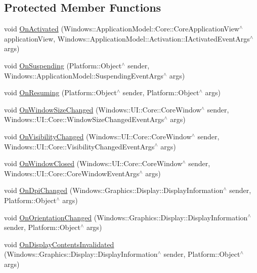 \subsection*{Protected Member Functions}
\begin{DoxyCompactItemize}
\item 
void \hyperlink{class_cube_1_1sealed_a7bfa5f48c7415394b76a4152b5fb6abf}{On\+Activated} (Windows\+::\+Application\+Model\+::\+Core\+::\+Core\+Application\+View$^\wedge$ application\+View, Windows\+::\+Application\+Model\+::\+Activation\+::\+I\+Activated\+Event\+Args$^\wedge$ args)
\item 
void \hyperlink{class_cube_1_1sealed_a45dbe3797567e448ec7b26db0f30ea56}{On\+Suspending} (Platform\+::\+Object$^\wedge$ sender, Windows\+::\+Application\+Model\+::\+Suspending\+Event\+Args$^\wedge$ args)
\item 
void \hyperlink{class_cube_1_1sealed_a131584644dbd091d751a242b7a234922}{On\+Resuming} (Platform\+::\+Object$^\wedge$ sender, Platform\+::\+Object$^\wedge$ args)
\item 
void \hyperlink{class_cube_1_1sealed_accf4a33eb3419f7f81e564bf888846fc}{On\+Window\+Size\+Changed} (Windows\+::\+U\+I\+::\+Core\+::\+Core\+Window$^\wedge$ sender, Windows\+::\+U\+I\+::\+Core\+::\+Window\+Size\+Changed\+Event\+Args$^\wedge$ args)
\item 
void \hyperlink{class_cube_1_1sealed_aec9fe501363859f4c53a08f85c07db67}{On\+Visibility\+Changed} (Windows\+::\+U\+I\+::\+Core\+::\+Core\+Window$^\wedge$ sender, Windows\+::\+U\+I\+::\+Core\+::\+Visibility\+Changed\+Event\+Args$^\wedge$ args)
\item 
void \hyperlink{class_cube_1_1sealed_ac8edc3442699dcdcd40b235a8d8ab906}{On\+Window\+Closed} (Windows\+::\+U\+I\+::\+Core\+::\+Core\+Window$^\wedge$ sender, Windows\+::\+U\+I\+::\+Core\+::\+Core\+Window\+Event\+Args$^\wedge$ args)
\item 
void \hyperlink{class_cube_1_1sealed_a4621df1969e0c25abcaf42b9b09c1294}{On\+Dpi\+Changed} (Windows\+::\+Graphics\+::\+Display\+::\+Display\+Information$^\wedge$ sender, Platform\+::\+Object$^\wedge$ args)
\item 
void \hyperlink{class_cube_1_1sealed_a6c53f2260bcb4d51d1e4c21df620dbe0}{On\+Orientation\+Changed} (Windows\+::\+Graphics\+::\+Display\+::\+Display\+Information$^\wedge$ sender, Platform\+::\+Object$^\wedge$ args)
\item 
void \hyperlink{class_cube_1_1sealed_a46527bc6fafc0e7ca68c97d3cc2a51d4}{On\+Display\+Contents\+Invalidated} (Windows\+::\+Graphics\+::\+Display\+::\+Display\+Information$^\wedge$ sender, Platform\+::\+Object$^\wedge$ args)
\end{DoxyCompactItemize}


